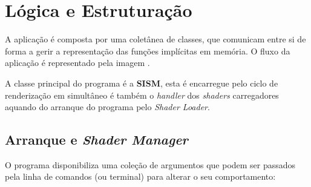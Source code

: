 \section{Lógica e Estruturação}
\label{sec::impl:estrutura}

A aplicação é composta por uma coletânea de classes, que comunicam entre si de forma a gerir a representação das funções implícitas em memória. O fluxo da aplicação é representado pela imagem .

A classe principal do programa é a \textbf{\ac{SISM}}, esta é encarregue pelo ciclo de renderização em simultâneo é também o \textit{handler} dos \textit{shaders} carregadores aquando do arranque do programa pelo \textit{Shader Loader}.


\subsection{Arranque e \textit{Shader Manager}}

O programa disponibiliza uma coleção de argumentos que podem ser passados pela linha de comandos (ou terminal) para alterar o seu comportamento:

